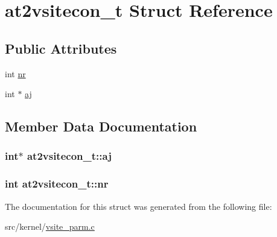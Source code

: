 \hypertarget{structat2vsitecon__t}{\section{at2vsitecon\-\_\-t \-Struct \-Reference}
\label{structat2vsitecon__t}
}
\subsection*{\-Public \-Attributes}
\begin{DoxyCompactItemize}
\item 
int \hyperlink{structat2vsitecon__t_a8e4cf7c21a8318aaae0ddd6e8f6edd2f}{nr}
\item 
int $\ast$ \hyperlink{structat2vsitecon__t_ae2ef22c5a511b1df6a8e451bd59ce44f}{aj}
\end{DoxyCompactItemize}


\subsection{\-Member \-Data \-Documentation}
\hypertarget{structat2vsitecon__t_ae2ef22c5a511b1df6a8e451bd59ce44f}{
\subsubsection[{aj}]{\setlength{\rightskip}{0pt plus 5cm}int$\ast$ {\bf at2vsitecon\-\_\-t\-::aj}}}\label{structat2vsitecon__t_ae2ef22c5a511b1df6a8e451bd59ce44f}
\hypertarget{structat2vsitecon__t_a8e4cf7c21a8318aaae0ddd6e8f6edd2f}{
\subsubsection[{nr}]{\setlength{\rightskip}{0pt plus 5cm}int {\bf at2vsitecon\-\_\-t\-::nr}}}\label{structat2vsitecon__t_a8e4cf7c21a8318aaae0ddd6e8f6edd2f}


\-The documentation for this struct was generated from the following file\-:\begin{DoxyCompactItemize}
\item 
src/kernel/\hyperlink{vsite__parm_8c}{vsite\-\_\-parm.\-c}\end{DoxyCompactItemize}
